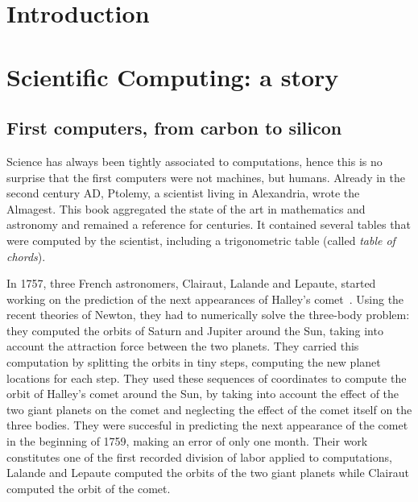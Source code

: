 \chapter{Introduction}
\label{chapter:introduction}



\chapter{Scientific Computing: a story}
\label{chapter:context}


    \section{First computers, from carbon to silicon}%
    \label{sec:first_computers}

        Science has always been tightly associated to computations, hence this is no surprise that the first computers
        were not machines, but humans. Already in the second century AD, Ptolemy, a scientist living in Alexandria,
        wrote the Almagest. This book aggregated the state of the art in mathematics and astronomy and remained a
        reference for centuries. It contained several tables that were computed by the scientist, including a
        trigonometric table (called \emph{table of chords}).

        In 1757, three French astronomers, Clairaut, Lalande and Lepaute, started working on the prediction of the next
        appearances of Halley's comet~\cite[Chapter~1]{human_computers}. Using the recent theories of Newton, they had
        to numerically solve the three-body problem: they computed the orbits of Saturn and Jupiter around the Sun,
        taking into account the attraction force between the two planets. They carried this computation by splitting the
        orbits in tiny steps, computing the new planet locations for each step. They used these sequences of coordinates
        to compute the orbit of Halley's comet around the Sun, by taking into account the effect of the two giant
        planets on the comet and neglecting the effect of the comet itself on the three bodies. They were succesful in
        predicting the next appearance of the comet in the beginning of 1759, making an error of only one month. Their
        work constitutes one of the first recorded division of labor applied to computations, Lalande and Lepaute
        computed the orbits of the two giant planets while Clairaut computed the orbit of the comet.

